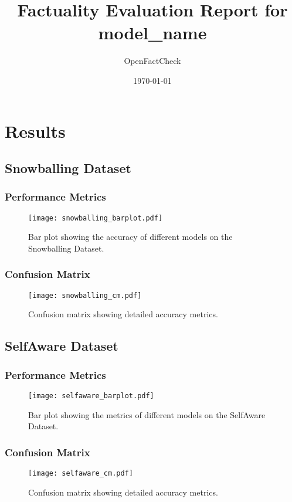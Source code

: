 \documentclass[12pt]{article}
\title{Factuality Evaluation Report for {{model_name}}}
\author{OpenFactCheck}
\date{\today}
\begin{document}
\maketitle
\thispagestyle{empty} %
\newpage

\setcounter{page}{1} %

\section{Results}
\subsection{Snowballing Dataset}
\subsubsection{Performance Metrics}
\begin{figure}[H]
    \centering
    \texttt{[image: snowballing\_barplot.pdf]}
    \caption{Bar plot showing the accuracy of different models on the Snowballing Dataset.}
\end{figure}

\subsubsection{Confusion Matrix}
\begin{figure}[H]
    \centering
    \texttt{[image: snowballing\_cm.pdf]}
    \caption{Confusion matrix showing detailed accuracy metrics.}
\end{figure}

\newpage

\subsection{SelfAware Dataset}
\subsubsection{Performance Metrics}
\begin{figure}[H]
    \centering
    \texttt{[image: selfaware\_barplot.pdf]}
    \caption{Bar plot showing the metrics of different models on the SelfAware Dataset.}
\end{figure}

\subsubsection{Confusion Matrix}
\begin{figure}[H]
    \centering
    \texttt{[image: selfaware\_cm.pdf]}
    \caption{Confusion matrix showing detailed accuracy metrics.}
\end{figure}
\end{document}

